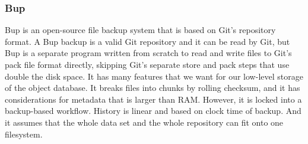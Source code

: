 \documentclass[a4paper]{article}
\begin{document}
\subsubsection{Bup}

Bup \cite{bup_homepage} is an open-source file backup system that is based on
Git's repository format. A Bup backup is a valid Git repository and it can be
read by Git, but Bup is a separate program written from scratch to read and
write files to Git's pack file format directly, skipping Git's separate store
and pack steps that use double the disk space. It has many features that we want
for our low-level storage of the object database. It breaks files into chunks by
rolling checksum, and it has considerations for metadata that is larger than
RAM. However, it is locked into a backup-based workflow. History is linear and
based on clock time of backup. And it assumes that the whole data set and the
whole repository can fit onto one filesystem.





\end{document}
